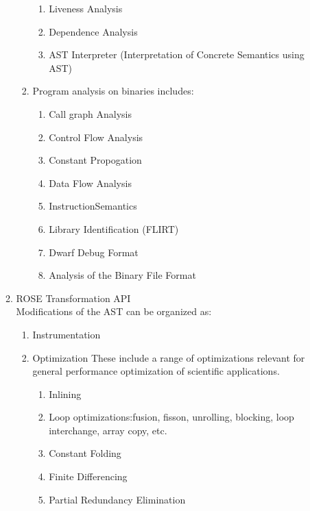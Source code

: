 \begin{enumerate}
\begin{enumerate}
\begin{enumerate}
\begin{enumerate}
               \item Liveness Analysis
               \item Dependence Analysis
               \item AST Interpreter (Interpretation of Concrete Semantics using AST)
            \end{enumerate}
            \item Program analysis on binaries includes:
            \begin{enumerate}
               \item Call graph Analysis
               \item Control Flow Analysis
               \item Constant Propogation
               \item Data Flow Analysis
               \item InstructionSemantics
               \item Library Identification (FLIRT)
               \item Dwarf Debug Format
               \item Analysis of the Binary File Format
            \end{enumerate}
         \end{enumerate}

      \item ROSE Transformation API \\
         Modifications of the AST can be organized as:
         \begin{enumerate}
            \item Instrumentation
            \item Optimization
               These include a range of optimizations relevant for general performance
               optimization of scientific applications.
            \begin{enumerate}
               \item Inlining
               \item Loop optimizations:fusion, fisson, unrolling, blocking, loop
                  interchange, array copy, etc.
               \item Constant Folding
               \item Finite Differencing
               \item Partial Redundancy Elimination
            \end{enumerate}


\end{enumerate}
\end{enumerate}
\end{enumerate}
